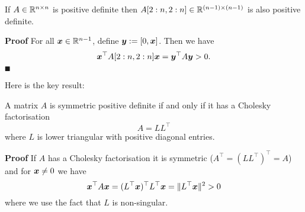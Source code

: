\begin{lemma} If $A \in {\mathbb R}^{n \times n}$ is positive definite then $A[2:n,2:n] \in {\mathbb R}^{(n-1) \times (n-1)}$ is also positive definite. \end{lemma}
\textbf{Proof} For all $\bm{{\mbox{\boldmath$x$\unboldmath}}} \in {\mathbb R}^{n-1}$, define $\bm{{\mbox{\boldmath$y$\unboldmath}}} := [0,\bm{{\mbox{\boldmath$x$\unboldmath}}}]$. Then we have
\[
\bm{{\mbox{\boldmath$x$\unboldmath}}}^\top A[2:n,2:n] \bm{{\mbox{\boldmath$x$\unboldmath}}} = \bm{{\mbox{\boldmath$y$\unboldmath}}}^\top A \bm{{\mbox{\boldmath$y$\unboldmath}}} > 0.
\]
\ensuremath{\QED}

Here is the key result:

\begin{theorem} A matrix $A$ is symmetric positive definite if and only if it has a Cholesky factorisation
\[
A = L L^\ensuremath{\top}
\]
where $L$ is lower triangular with positive diagonal entries.

\end{theorem}
\textbf{Proof} If $A$ has a Cholesky factorisation it is symmetric ($A^\ensuremath{\top} = (L L^\ensuremath{\top})^\ensuremath{\top} = A$) and for $\bm{{\mbox{\boldmath$x$\unboldmath}}} \neq 0$ we have
\[
\bm{{\mbox{\boldmath$x$\unboldmath}}}^\top A \bm{{\mbox{\boldmath$x$\unboldmath}}} = (L^\top\bm{{\mbox{\boldmath$x$\unboldmath}}})^\top L^\top \bm{{\mbox{\boldmath$x$\unboldmath}}} = \|L^\top\bm{{\mbox{\boldmath$x$\unboldmath}}}\|^2 > 0
\]
where we use the fact that $L$ is non-singular.

